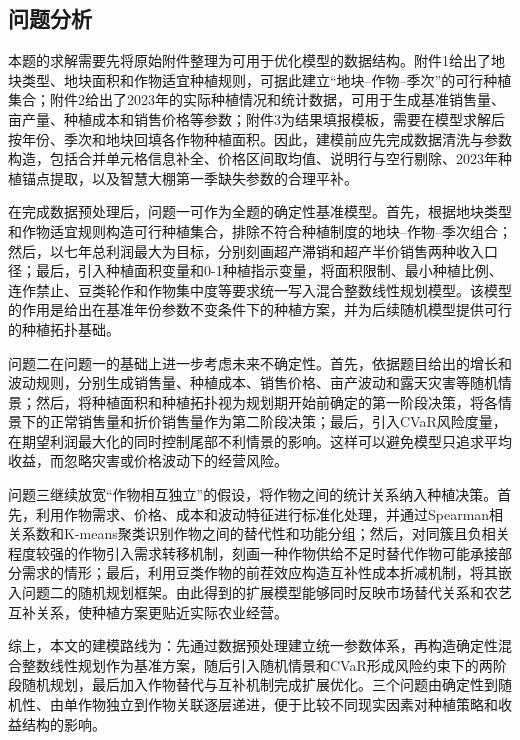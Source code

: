 \subsection{问题分析}

本题的求解需要先将原始附件整理为可用于优化模型的数据结构。附件1给出了地块类型、地块面积和作物适宜种植规则，可据此建立“地块--作物--季次”的可行种植集合；附件2给出了2023年的实际种植情况和统计数据，可用于生成基准销售量、亩产量、种植成本和销售价格等参数；附件3为结果填报模板，需要在模型求解后按年份、季次和地块回填各作物种植面积。因此，建模前应先完成数据清洗与参数构造，包括合并单元格信息补全、价格区间取均值、说明行与空行剔除、2023年种植锚点提取，以及智慧大棚第一季缺失参数的合理平补。

在完成数据预处理后，问题一可作为全题的确定性基准模型。首先，根据地块类型和作物适宜规则构造可行种植集合，排除不符合种植制度的地块--作物--季次组合；然后，以七年总利润最大为目标，分别刻画超产滞销和超产半价销售两种收入口径；最后，引入种植面积变量和0-1种植指示变量，将面积限制、最小种植比例、连作禁止、豆类轮作和作物集中度等要求统一写入混合整数线性规划模型。该模型的作用是给出在基准年份参数不变条件下的种植方案，并为后续随机模型提供可行的种植拓扑基础。

问题二在问题一的基础上进一步考虑未来不确定性。首先，依据题目给出的增长和波动规则，分别生成销售量、种植成本、销售价格、亩产波动和露天灾害等随机情景；然后，将种植面积和种植拓扑视为规划期开始前确定的第一阶段决策，将各情景下的正常销售量和折价销售量作为第二阶段决策；最后，引入CVaR风险度量，在期望利润最大化的同时控制尾部不利情景的影响。这样可以避免模型只追求平均收益，而忽略灾害或价格波动下的经营风险。

问题三继续放宽“作物相互独立”的假设，将作物之间的统计关系纳入种植决策。首先，利用作物需求、价格、成本和波动特征进行标准化处理，并通过Spearman相关系数和K-means聚类识别作物之间的替代性和功能分组；然后，对同簇且负相关程度较强的作物引入需求转移机制，刻画一种作物供给不足时替代作物可能承接部分需求的情形；最后，利用豆类作物的前茬效应构造互补性成本折减机制，将其嵌入问题二的随机规划框架。由此得到的扩展模型能够同时反映市场替代关系和农艺互补关系，使种植方案更贴近实际农业经营。

综上，本文的建模路线为：先通过数据预处理建立统一参数体系，再构造确定性混合整数线性规划作为基准方案，随后引入随机情景和CVaR形成风险约束下的两阶段随机规划，最后加入作物替代与互补机制完成扩展优化。三个问题由确定性到随机性、由单作物独立到作物关联逐层递进，便于比较不同现实因素对种植策略和收益结构的影响。
